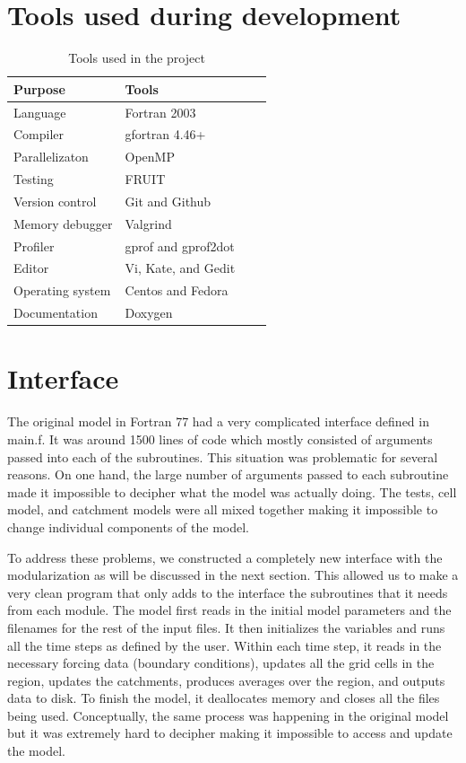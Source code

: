 \documentclass[pdftex,12pt,a4paper]{article}
\begin{document}
\newpage
\section{Tools used during development}
\begin{table}[ht]
  \begin{center}
    \caption{Tools used in the project}
    \begin{tabular}{ | l | l | l | p{5cm} |}
    \hline
    Purpose & Tools \\ \hline
    Language & Fortran 2003 \\
    Compiler & gfortran 4.46+ \\
    Parallelizaton & OpenMP \\
    Testing & FRUIT \\ 
    Version control & Git and Github \\ 
    Memory debugger & Valgrind \\ 
    Profiler & gprof and gprof2dot\\ 
    Editor & Vi, Kate, and Gedit \\
    Operating system & Centos and Fedora \\
    Documentation & Doxygen \\ \hline
    \end{tabular}
  \end{center}
\end{table}

\section{Interface}
The original model in Fortran 77 had a very complicated interface defined in main.f. It was around 1500 lines of code which mostly consisted of arguments passed into each of the subroutines. This situation was problematic for several reasons. On one hand, the large number of arguments passed to each subroutine made it impossible to decipher what the model was actually doing. The tests, cell model, and catchment models were all mixed together making it impossible to change individual components of the model. 

\vspace{1em}

To address these problems, we constructed a completely new interface with the modularization as will be discussed in the next section. This allowed us to make a very clean program that only adds to the interface the subroutines that it needs from each module. The model first reads in the initial model parameters and the filenames for the rest of the input files. It then initializes the variables and runs all the time steps as defined by the user. Within each time step, it reads in the necessary forcing data (boundary conditions), updates all the grid cells in the region, updates the catchments, produces averages over the region, and outputs data to disk. To finish the model, it deallocates memory and closes all the files being used. Conceptually, the same process was happening in the original model but it was extremely hard to decipher making it impossible to access and update the model. 
\end{document}
